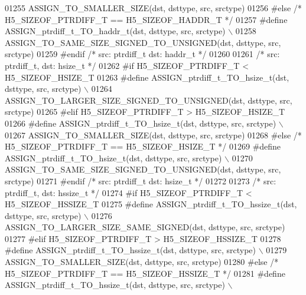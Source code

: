 \begin{DoxyCode}
01255 \textcolor{preprocessor}{        ASSIGN\_TO\_SMALLER\_SIZE(dst, dsttype, src, srctype)}
01256 \textcolor{preprocessor}{#else }\textcolor{comment}{/* H5\_SIZEOF\_PTRDIFF\_T == H5\_SIZEOF\_HADDR\_T */}\textcolor{preprocessor}{}
01257 \textcolor{preprocessor}{    #define ASSIGN\_ptrdiff\_t\_TO\_haddr\_t(dst, dsttype, src, srctype) \(\backslash\)}
01258 \textcolor{preprocessor}{        ASSIGN\_TO\_SAME\_SIZE\_SIGNED\_TO\_UNSIGNED(dst, dsttype, src, srctype)}
01259 \textcolor{preprocessor}{#endif }\textcolor{comment}{/* src: ptrdiff\_t dst: haddr\_t */}\textcolor{preprocessor}{}
01260 
01261 \textcolor{comment}{/* src: ptrdiff\_t, dst: hsize\_t */}
01262 \textcolor{preprocessor}{#if H5\_SIZEOF\_PTRDIFF\_T < H5\_SIZEOF\_HSIZE\_T}
01263 \textcolor{preprocessor}{    #define ASSIGN\_ptrdiff\_t\_TO\_hsize\_t(dst, dsttype, src, srctype) \(\backslash\)}
01264 \textcolor{preprocessor}{        ASSIGN\_TO\_LARGER\_SIZE\_SIGNED\_TO\_UNSIGNED(dst, dsttype, src, srctype)}
01265 \textcolor{preprocessor}{#elif H5\_SIZEOF\_PTRDIFF\_T > H5\_SIZEOF\_HSIZE\_T}
01266 \textcolor{preprocessor}{    #define ASSIGN\_ptrdiff\_t\_TO\_hsize\_t(dst, dsttype, src, srctype) \(\backslash\)}
01267 \textcolor{preprocessor}{        ASSIGN\_TO\_SMALLER\_SIZE(dst, dsttype, src, srctype)}
01268 \textcolor{preprocessor}{#else }\textcolor{comment}{/* H5\_SIZEOF\_PTRDIFF\_T == H5\_SIZEOF\_HSIZE\_T */}\textcolor{preprocessor}{}
01269 \textcolor{preprocessor}{    #define ASSIGN\_ptrdiff\_t\_TO\_hsize\_t(dst, dsttype, src, srctype) \(\backslash\)}
01270 \textcolor{preprocessor}{        ASSIGN\_TO\_SAME\_SIZE\_SIGNED\_TO\_UNSIGNED(dst, dsttype, src, srctype)}
01271 \textcolor{preprocessor}{#endif }\textcolor{comment}{/* src: ptrdiff\_t dst: hsize\_t */}\textcolor{preprocessor}{}
01272 
01273 \textcolor{comment}{/* src: ptrdiff\_t, dst: hssize\_t */}
01274 \textcolor{preprocessor}{#if H5\_SIZEOF\_PTRDIFF\_T < H5\_SIZEOF\_HSSIZE\_T}
01275 \textcolor{preprocessor}{    #define ASSIGN\_ptrdiff\_t\_TO\_hssize\_t(dst, dsttype, src, srctype) \(\backslash\)}
01276 \textcolor{preprocessor}{        ASSIGN\_TO\_LARGER\_SIZE\_SAME\_SIGNED(dst, dsttype, src, srctype)}
01277 \textcolor{preprocessor}{#elif H5\_SIZEOF\_PTRDIFF\_T > H5\_SIZEOF\_HSSIZE\_T}
01278 \textcolor{preprocessor}{    #define ASSIGN\_ptrdiff\_t\_TO\_hssize\_t(dst, dsttype, src, srctype) \(\backslash\)}
01279 \textcolor{preprocessor}{        ASSIGN\_TO\_SMALLER\_SIZE(dst, dsttype, src, srctype)}
01280 \textcolor{preprocessor}{#else }\textcolor{comment}{/* H5\_SIZEOF\_PTRDIFF\_T == H5\_SIZEOF\_HSSIZE\_T */}\textcolor{preprocessor}{}
01281 \textcolor{preprocessor}{    #define ASSIGN\_ptrdiff\_t\_TO\_hssize\_t(dst, dsttype, src, srctype) \(\backslash\)}

\end{DoxyCode}
